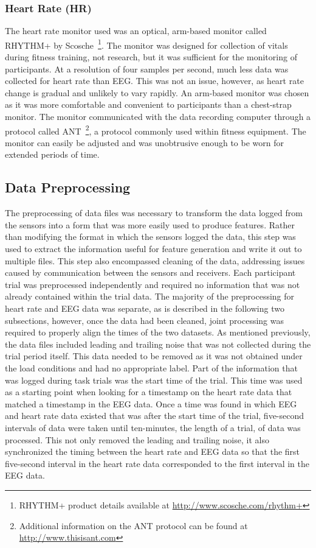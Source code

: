 \documentclass[11pt]{article}
\begin{document}
		\subsubsection{Heart Rate (HR)}
		The heart rate monitor used was an optical, arm-based monitor called RHYTHM+ by Scosche~\footnote{RHYTHM+ product details available at \url{http://www.scosche.com/rhythm+}}. The monitor was designed for collection of vitals during fitness training, not research, but it was sufficient for the monitoring of participants. At a resolution of four samples per second, much less data was collected for heart rate than EEG. This was not an issue, however, as heart rate change is gradual and unlikely to vary rapidly. An arm-based monitor was chosen as it was more comfortable and convenient to participants than a chest-strap monitor. The monitor communicated with the data recording computer through a protocol called ANT~\footnote{Additional information on the ANT protocol can be found at \url{http://www.thisisant.com}}, a protocol commonly used within fitness equipment.  The monitor can easily be adjusted and was unobtrusive enough to be worn for extended periods of time.
		
	\subsection{Data Preprocessing}
	The preprocessing of data files was necessary to transform the data logged from the sensors into a form that was more easily used to produce features. Rather than modifying the format in which the sensors logged the data, this step was used to extract the information useful for feature generation and write it out to multiple files. This step also encompassed cleaning of the data, addressing issues caused by communication between the sensors and receivers. Each participant trial was preprocessed independently and required no information that was not already contained within the trial data. The majority of the preprocessing for heart rate and EEG data was separate, as is described in the following two subsections, however, once the data had been cleaned, joint processing was required to properly align the times of the two datasets. As mentioned previously, the data files included leading and trailing noise that was not collected during the trial period itself. This data needed to be removed as it was not obtained under the load conditions and had no appropriate label. Part of the information that was logged during task trials was the start time of the trial. This time was used as a starting point when looking for a timestamp on the heart rate data that matched a timestamp in the EEG data. Once a time was found in which EEG and heart rate data existed that was after the start time of the trial, five-second intervals of data were taken until ten-minutes, the length of a trial, of data was processed. This not only removed the leading and trailing noise, it also synchronized the timing between the heart rate and EEG data so that the first five-second interval in the heart rate data corresponded to the first interval in the EEG data.
	
\end{document}
